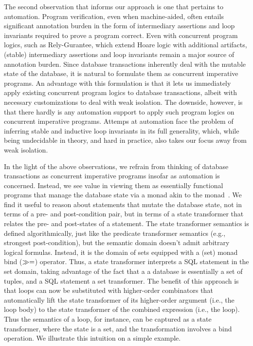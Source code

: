 The second observation that informs our approach is one that pertains
to automation. Program verification, even when machine-aided, often
entails significant annotation burden in the form of intermediary
assertions and loop invariants required to prove a program correct.
Even with concurrent program logics, such as Rely-Gurantee, which
extend Hoare logic with additional artifacts, (stable) intermediary
assertions and loop invariants remain a major source of annotation
burden. Since database transactions inherently deal with the mutable
state of the database, it is natural to formulate them as concurrent
imperative programs. An advantage with this formulation is that it
lets us immediately apply existing concurrent program logics to
database transactions, albeit with necessary customizations to deal
with weak isolation. The downside, however, is that there hardly is
any automation support to apply such program logics on concurrent
imperative programs. Attemps at automation face the problem of
inferring stable and inductive loop invariants in its full generality,
which, while being undecidable in theory, and hard in practice, also
takes our focus away from weak isolation.

In the light of the above observations, we refrain from thinking of
database transactions as concurrent imperative programs insofar as
automation is concerned.  Instead, we see value in viewing them as
essentially functional programs that manage the database state via a
monad akin to the  monad~\cite{statemonad}. We find it useful
to reason about statements that mutate the database state, not in
terms of a pre- and post-condition pair, but in terms of a state
transformer that relates the pre- and post-states of a statement. The
state transformer semantics is defined algorithmically, just like the
predicate transformer semantics (e.g., strongest post-condition), but
the semantic domain doesn't admit arbitrary logical formulas. Instead,
it is the domain of sets equipped with a (set) monad bind ($\gg=$)
operator.  Thus, a state transformer interprets a SQL statement in the
set domain, taking advantage of the fact that a a database is
essentially a set of tuples, and a SQL statement a set transformer.
The benefit of this approach is that loops can now be substituted with
higher-order combinators that automatically lift the state transformer
of its higher-order argument (i.e., the loop body) to the state
transformer of the combined expression (i.e., the loop).  Thus the
semantics of a  loop, for instance, can be captured as a
state transformer, where the state is a set, and the transformation
involves a bind operation. We illustrate this intuition on a simple
example.


